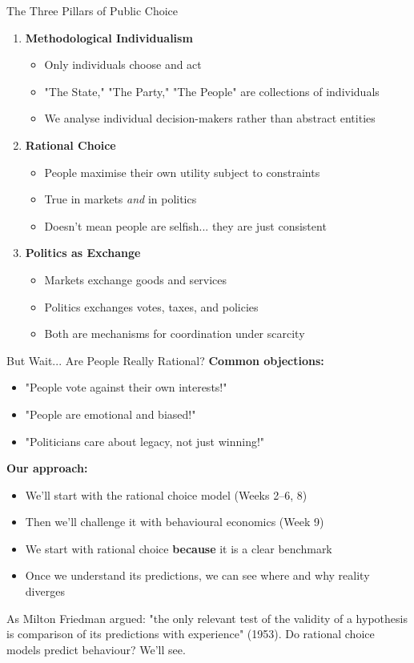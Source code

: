 \documentclass[10pt]{beamer}
\begin{document}
\begin{frame}{The Three Pillars of Public Choice}
\begin{enumerate}
\item \textbf{Methodological Individualism}
\begin{itemize}
\item Only individuals choose and act
\item "The State," "The Party," "The People" are collections of individuals
\item We analyse individual decision-makers rather than abstract entities
\end{itemize}

\pause
\item \textbf{Rational Choice}
\begin{itemize}
\item People maximise their own utility subject to constraints
\item True in markets \textit{and} in politics
\item Doesn't mean people are selfish... they are just consistent
\end{itemize}

\pause
\item \textbf{Politics as Exchange}
\begin{itemize}
\item Markets exchange goods and services
\item Politics exchanges votes, taxes, and policies
\item Both are mechanisms for coordination under scarcity
\end{itemize}
\end{enumerate}
\end{frame}

\begin{frame}{But Wait... Are People Really Rational?}
\textbf{Common objections:}
\begin{itemize}
\item "People vote against their own interests!"
\item "People are emotional and biased!"
\item "Politicians care about legacy, not just winning!"
\end{itemize}

\pause
\vspace{0.5cm}
\textbf{Our approach:}
\begin{itemize}
\item We'll start with the rational choice model (Weeks 2--6, 8)
\item Then we'll challenge it with behavioural economics (Week 9)
\item We start with rational choice \textbf{because} it is a clear benchmark
\item Once we understand its predictions, we can see where and why reality diverges
\end{itemize}

\pause
\small{As Milton Friedman argued: "the only relevant test of the validity of a hypothesis is comparison of its predictions with experience" (1953). Do rational choice models predict behaviour? We'll see.}
\end{frame}
\end{document}
